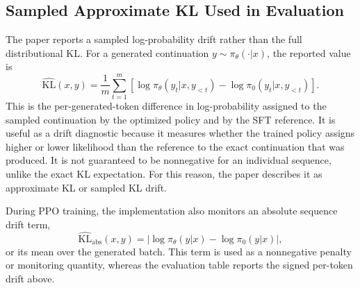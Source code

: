 \documentclass[11pt]{article}
\newcommand{\kl}{\mathrm{KL}}
\begin{document}
\subsection{Sampled Approximate KL Used in Evaluation}
The paper reports a sampled log-probability drift rather than the full distributional KL. For a generated continuation $y\sim\pi_\theta(\cdot|x)$, the reported value is
\begin{equation}
    \widehat{\kl}(x,y)=\frac{1}{m}\sum_{t=1}^{m}
    \left[\log\pi_\theta(y_t|x,y_{<t})-
    \log\pi_0(y_t|x,y_{<t})\right].
\end{equation}
This is the per-generated-token difference in log-probability assigned to the sampled continuation by the optimized policy and by the SFT reference. It is useful as a drift diagnostic because it measures whether the trained policy assigns higher or lower likelihood than the reference to the exact continuation that was produced. It is not guaranteed to be nonnegative for an individual sequence, unlike the exact KL expectation. For this reason, the paper describes it as approximate KL or sampled KL drift.

During PPO training, the implementation also monitors an absolute sequence drift term,
\begin{equation}
    \widehat{\kl}_{\mathrm{abs}}(x,y)=\left|\log\pi_\theta(y|x)-\log\pi_0(y|x)\right|,
\end{equation}
or its mean over the generated batch. This term is used as a nonnegative penalty or monitoring quantity, whereas the evaluation table reports the signed per-token drift above.
\end{document}
